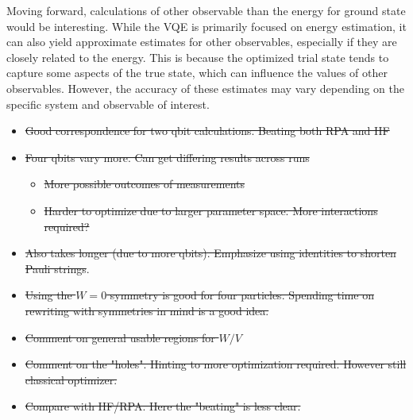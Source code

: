 Moving forward, calculations of other observable than the energy for ground state would be interesting. While the VQE is primarily focused on energy estimation, it can also yield approximate estimates for other observables, especially if they are closely related to the energy. This is because the optimized trial state tends to capture some aspects of the true state, which can influence the values of other observables. However, the accuracy of these estimates may vary depending on the specific system and observable of interest.
\begin{itemize}
    \item \st{Good correspondence for two qbit calculations. Beating both RPA and HF} 
    \item \st{Four qbits vary more. Can get differing results across runs} \begin{itemize}
        \item \st{More possible outcomes of measurements}
        \item \st{Harder to optimize due to larger parameter space. More interactions required?}
    \end{itemize}  
    \item \st{Also takes longer (due to more qbits). Emphasize using identities to shorten Pauli strings}.
    \item \st{Using the $W=0$ symmetry is good for four particles. Spending time on rewriting with symmetries in mind is a good idea.} 
    \item \st{Comment on general usable regions for $W/V$}
    \item \st{Comment on the "holes". Hinting to more optimization required. However still classical optimizer.} 
    \item \st{Compare with HF/RPA. Here the "beating" is less clear.}
\end{itemize}